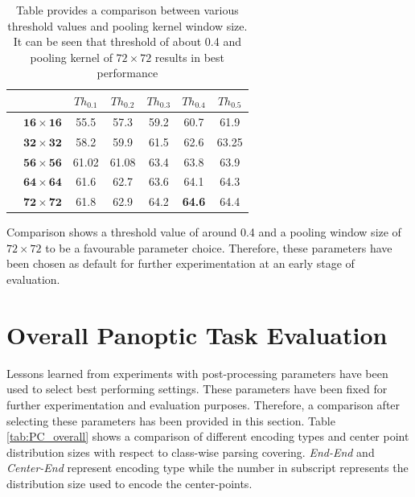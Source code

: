 \begin{table}[H] %
    \centering
    \begin{tabular}{crSSSSS}
        \hline
        & & $Th_{0.1}$ & $Th_{0.2}$ & $Th_{0.3}$ & $Th_{0.4}$& $Th_{0.5}$ \\%
        \hline
        \parbox[t]{2mm}{}
        & $\mathbf{16\times16}$ & 55.5 & 57.3 & 59.2 & 60.7 & 61.9 \\
        & $\mathbf{32\times32}$ & 58.2 & 59.9 & 61.5 & 62.6 & 63.25\\
        & $\mathbf{56\times56}$ & 61.02 & 61.08 & 63.4 & 63.8 & 63.9\\
        & $\mathbf{64\times64}$ & 61.6 & 62.7 & 63.6 & 64.1 & 64.3\\
        & $\mathbf{72\times72}$ & 61.8 & 62.9 & 64.2 & \textbf{64.6} & 64.4\\
        \hline
    \end{tabular}
    \caption[Comparison of Threshold value and Pooling Kernel Window]{Table provides a comparison between various threshold values and pooling kernel window size. It can be seen that threshold of about 0.4 and pooling kernel of $72\times72$ results in best performance}
    \label{tab:parameter_comparison}
\end{table}


Comparison shows a threshold value of around 0.4 and a pooling window size of $72\times72$ to be a favourable parameter choice. Therefore, these parameters have been chosen as default for further experimentation at an early stage of evaluation.



\section{Overall Panoptic Task Evaluation}

Lessons learned from experiments with post-processing parameters have been used to select best performing settings. These parameters have been fixed for further experimentation and evaluation purposes. Therefore, a comparison after selecting these parameters has been provided in this section. Table \ref{tab:PC_overall} shows a comparison of different encoding types and center point distribution sizes with respect to class-wise parsing covering. \textit{End-End} and \textit{Center-End} represent encoding type while the number in subscript represents the distribution size used to encode the center-points.



